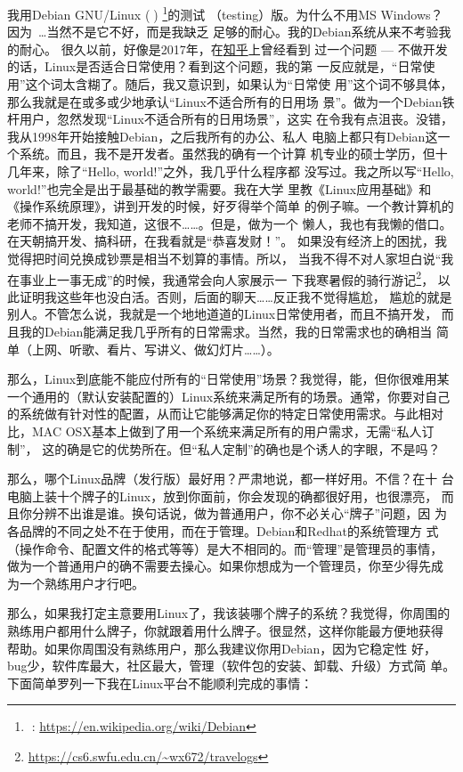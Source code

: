 我用Debian GNU/Linux ()%
\footnote{: \url{https://en.wikipedia.org/wiki/Debian}}的测试
（testing）版。为什么不用MS Windows？ 因为~\ldots 当然不是它不好，而是我缺乏
足够的耐心。我的Debian系统从来不考验我的耐心。
很久以前，好像是2017年，在\href{https://www.zhihu.com}{知乎}上曾经看到
过一个问题 --- 不做开发的话，Linux是否适合日常使用？看到这个问题，我的第
一反应就是，“日常使用”这个词太含糊了。随后，我又意识到，如果认为“日常使
用”这个词不够具体，那么我就是在或多或少地承认“Linux不适合所有的日用场
景”。做为一个Debian铁杆用户，忽然发现“Linux不适合所有的日用场景”，这实
在令我有点沮丧。没错，我从1998年开始接触Debian，之后我所有的办公、私人
电脑上都只有Debian这一个系统。而且，我不是开发者。虽然我的确有一个计算
机专业的硕士学历，但十几年来，除了“Hello, world!”之外，我几乎什么程序都
没写过。我之所以写“Hello, world!”也完全是出于最基础的教学需要。我在大学
里教《Linux应用基础》和《操作系统原理》，讲到开发的时候，好歹得举个简单
的例子嘛。一个教计算机的老师不搞开发，我知道，这很不……。但是，做为一个
懒人，我也有我懒的借口。在天朝搞开发、搞科研，在我看就是“恭喜发财！”。
如果没有经济上的困扰，我觉得把时间兑换成钞票是相当不划算的事情。所以，
当我不得不对人家坦白说“我在事业上一事无成”的时候，我通常会向人家展示一
下我寒暑假的骑行游记\footnote{\url{https://cs6.swfu.edu.cn/~wx672/travelogs}}，%
以此证明我这些年也没白活。否则，后面的聊天……反正我不觉得尴尬，
尴尬的就是别人。不管怎么说，我就是一个地地道道的Linux日常使用者，而且不搞开发，
而且我的Debian能满足我几乎所有的日常需求。当然，我的日常需求也的确相当
简单（上网、听歌、看片、写讲义、做幻灯片……）。

那么，Linux到底能不能应付所有的“日常使用”场景？我觉得，能，但你很难用某
一个通用的（默认安装配置的）Linux系统来满足所有的场景。通常，你要对自己
的系统做有针对性的配置，从而让它能够满足你的特定日常使用需求。与此相对
比，MAC OSX基本上做到了用一个系统来满足所有的用户需求，无需“私人订制”，
这的确是它的优势所在。但“私人定制”的确也是个诱人的字眼，不是吗？

那么，哪个Linux品牌（发行版）最好用？严肃地说，都一样好用。不信？在十
台电脑上装十个牌子的Linux，放到你面前，你会发现的确都很好用，也很漂亮，
而且你分辨不出谁是谁。换句话说，做为普通用户，你不必关心“牌子”问题，因
为各品牌的不同之处不在于使用，而在于管理。Debian和Redhat的系统管理方
式（操作命令、配置文件的格式等等）是大不相同的。而“管理”是管理员的事情，
做为一个普通用户的确不需要去操心。如果你想成为一个管理员，你至少得先成
为一个熟练用户才行吧。

那么，如果我打定主意要用Linux了，我该装哪个牌子的系统？我觉得，你周围的
熟练用户都用什么牌子，你就跟着用什么牌子。很显然，这样你能最方便地获得
帮助。如果你周围没有熟练用户，那么我建议你用Debian，因为它稳定性
好，bug少，软件库最大，社区最大，管理（软件包的安装、卸载、升级）方式简
单。下面简单罗列一下我在Linux平台不能顺利完成的事情：

